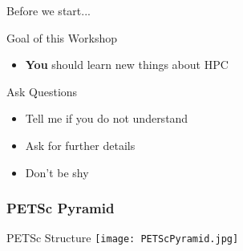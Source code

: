 






\begin{frame}{Before we start...}

   \begin{block}{Goal of this Workshop}
    \begin{itemize}
     \item {\Huge \textbf{\color{red} You}} should learn new things about HPC
    \end{itemize}
   \end{block}

   \vspace*{1cm}
   \begin{block}{Ask Questions}
    \begin{itemize}
     \item Tell me if you do not understand
     \item Ask for further details
     \item Don't be shy
    \end{itemize}
   \end{block}

\end{frame}






%
%












\begin{frame}[fragile]
\frametitle{PETSc Pyramid}
 \begin{block}{PETSc Structure} \vspace{0.3cm}
   \texttt{[image: PETScPyramid.jpg]}
 \end{block}

\end{frame}


